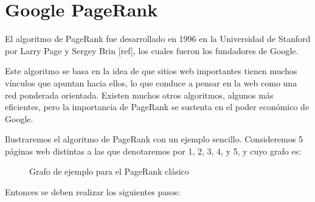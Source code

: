 \chapter{Google PageRank}

El algoritmo de PageRank fue desarrollado en 1996 en la Universidad de Stanford por Larry Page y Sergey Brin [ref], los cuales fueron los fundadores de Google.

Este algoritmo se basa en la idea de que sitios web importantes tienen muchos vínculos que apuntan hacia ellos, lo que conduce a pensar en la web como una red ponderada orientada. Existen muchos otros algoritmos, algunos más eficientes, pero la importancia de PageRank se sustenta en el poder económico de Google.

Ilustraremos el algoritmo de PageRank con un ejemplo sencillo. Consideremos 5 páginas web distintas a las que denotaremos por 1, 2, 3, 4, y 5, y cuyo grafo es:

\begin{figure}[H]
    \centering
    \caption[Grafo de ejemplo para el PageRank clásico]{Grafo de ejemplo para el PageRank clásico}
    \label{fig:examplegraph}
\end{figure}

Entonces se deben realizar los siguientes pasos:

